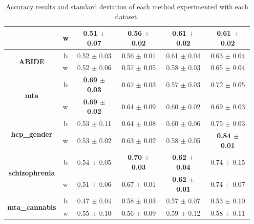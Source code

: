 \begin{table}
{\begin{tabular}{c|c|c|c|c|c}
		\cline{2-6}
		& \multicolumn{1}{l|}{w} & 0.51 $\pm$ 0.07            & 0.56 $\pm$ 0.02    & 0.61 $\pm$ 0.02 & 0.61 $\pm$ 0.02                      \\ 
		\bottomrule
		\multirow{2}{*}{\textbf{ABIDE}}                              & b                      & 0.52 $\pm$ 0.03            & 0.56 $\pm$ 0.01    &  0.61 $\pm$ 0.04                     & 0.63 $\pm$ 0.04                      \\ 
		\cline{2-6}
		& \multicolumn{1}{l|}{w} & 0.52 $\pm$ 0.06            & 0.57 $\pm$ 0.05    & 0.58 $\pm$ 0.03 & 0.65 $\pm$ 0.04                      \\ 
		\bottomrule
		\multirow{2}{*}{\textbf{mta}}                                & b                      & \textbf{0.69 $\pm$ 0.03}           & 0.67 $\pm$ 0.03    & 0.57 $\pm$ 0.03                      & 0.72 $\pm$ 0.05                      \\ 
		\cline{2-6}
		& \multicolumn{1}{l|}{w} & \textbf{0.69 $\pm$ 0.02}            & 0.64 $\pm$ 0.09    & 0.60 $\pm$ 0.02  & 0.69 $\pm$ 0.03                      \\ 
		\bottomrule
		\multirow{2}{*}{\textbf{hcp\_gender}}                        & b                      & 0.53 $\pm$ 0.11            & 0.64 $\pm$ 0.08    &  0.60 $\pm$ 0.06                     & 0.75 $\pm$ 0.03                      \\ 
		\cline{2-6}
		& \multicolumn{1}{l|}{w} & 0.53 $\pm$ 0.02            & 0.63 $\pm$ 0.02    & 0.58 $\pm$ 0.05 & \textbf{0.84 $\pm$ 0.01}             \\ 
		\bottomrule
		\multirow{2}{*}{\textbf{schizophrenia}}                      & b                      & 0.54 $\pm$ 0.05            & \textbf{0.70 $\pm$ 0.03}    & \textbf{0.62 $\pm$ 0.04 }                     & 0.74 $\pm$ 0.15                      \\ 
		\cline{2-6}
		& \multicolumn{1}{l|}{w} & 0.51 $\pm$ 0.06            & 0.67 $\pm$ 0.01    & \textbf{0.62 $\pm$ 0.01}   & 0.74 $\pm$ 0.07                      \\ 
		\bottomrule
		\multicolumn{1}{l|}{\multirow{2}{*}{\textbf{mta\_cannabis}}} & b                      & 0.47 $\pm$ 0.04            & 0.58 $\pm$ 0.03    & 0.57 $\pm$ 0.07 & 0.53 $\pm$ 0.10                      \\ 
		\cline{3-6}
		\multicolumn{1}{l|}{}                                        & w                      & 0.55 $\pm$ 0.10            & 0.56 $\pm$ 0.09    & 0.59 $\pm$ 0.12 & 0.58 $\pm$ 0.11                      \\
		\hline
		\end{tabular}
	}
		\caption{Accuracy results and standard deviation of each method experimented with each dataset.}
		\label{tab:all_results}
\end{table}
		

